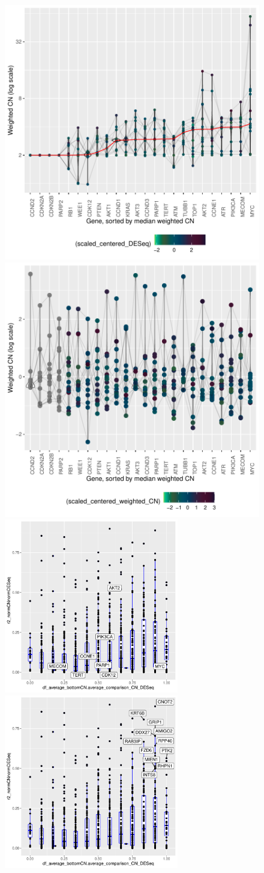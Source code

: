 \documentclass{article}
\begin{document}
\begin{figure}[h]
\centering
\includegraphics[width=.45\textwidth]{../../RNASeq_and_CN/figures/CN_violinplots_goi.pdf}
\includegraphics[width=.45\textwidth]{../../RNASeq_and_CN/figures/CN_violinplots_goi_2.pdf}
\includegraphics[width=3in]{../../RNASeq_and_CN/figures/r2normCNnormDESeq_vs_averagebottomCN.pdf}
\includegraphics[width=3in]{../../RNASeq_and_CN/figures/r2normCNnormDESeq_vs_averagebottomCN_best.pdf}

\end{figure}
\end{document}
